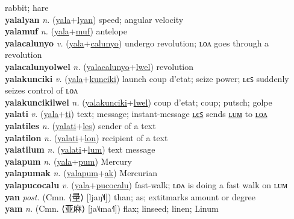 rabbit; hare \label{yalalonnyec} \\
\textbf{yalalyan} \textit{n.} (\hyperref[yala]{yala}+\hyperref[lyan]{lyan})
speed; angular velocity \label{yalalyan} \\
\textbf{yalamuf} \textit{n.} (\hyperref[yala]{yala}+\hyperref[muf]{muf})
antelope \label{yalamuf} \\
\textbf{yalacalunyo} \textit{v.} (\hyperref[yala]{yala}+\hyperref[calunyo]{calunyo})
undergo revolution; ʟᴏᴧ goes through a revolution \label{yalacalunyo} \\
\textbf{yalacalunyolwel} \textit{n.} (\hyperref[yalacalunyo]{yalacalunyo}+\hyperref[lwel]{lwel})
revolution \label{yalacalunyolwel} \\
\textbf{yalakunciki} \textit{v.} (\hyperref[yala]{yala}+\hyperref[kunciki]{kunciki})
launch coup d'etat; seize power; ʟєꜱ suddenly seizes control of ʟᴏᴧ \label{yalakunciki} \\
\textbf{yalakuncikilwel} \textit{n.} (\hyperref[yalakunciki]{yalakunciki}+\hyperref[lwel]{lwel})
coup d'etat; coup; putsch; golpe \label{yalakuncikilwel} \\
\textbf{yalati} \textit{v.} (\hyperref[yala]{yala}+\hyperref[ti]{ti})
text; message; instant-message \hyperref[yalatiles]{ʟєꜱ} sends \hyperref[yalatilum]{ʟᴜᴍ} to \hyperref[yalatilon]{ʟᴏᴧ} \label{yalati} \\
\textbf{yalatiles} \textit{n.} (\hyperref[yalati]{yalati}+\hyperref[les]{les})
sender of a text \label{yalatiles} \\
\textbf{yalatilon} \textit{n.} (\hyperref[yalati]{yalati}+\hyperref[lon]{lon})
recipient of a text \label{yalatilon} \\
\textbf{yalatilum} \textit{n.} (\hyperref[yalati]{yalati}+\hyperref[lum]{lum})
text message \label{yalatilum} \\
\textbf{yalapum} \textit{n.} (\hyperref[yala]{yala}+\hyperref[pum]{pum})
Mercury \label{yalapum} \\
\textbf{yalapumak} \textit{n.} (\hyperref[yalapum]{yalapum}+\hyperref[ak]{ak})
Mercurian \label{yalapumak} \\
\textbf{yalapucocalu} \textit{v.} (\hyperref[yala]{yala}+\hyperref[pucocalu]{pucocalu})
fast-walk; ʟᴏᴧ is doing a fast walk on ʟᴜᴍ \label{yalapucocalu} \\
\textbf{yan} \textit{post.} (Cmn. ⟨量⟩ [ljaŋ˥˩])
than; as; 	extit{marks amount or degree} \label{yan} \\
\textbf{yam} \textit{n.} (Cmn. ⟨亚麻⟩ [ja˥˩ma˧˥])
flax; linseed; linen; Linum \label{yam} \\
